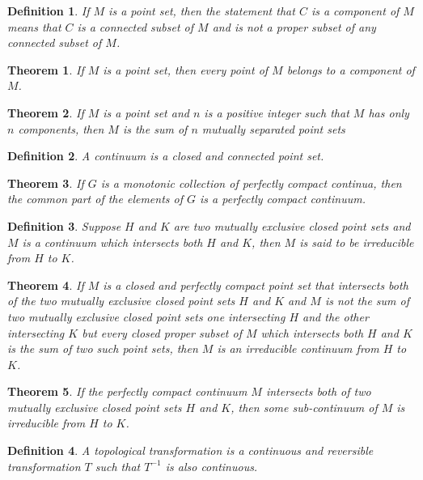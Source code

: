 \documentclass[10pt]{report}
\newtheorem{theorem}{Theorem}
\newtheorem{definition}{Definition}
\begin{document}
\begin{definition}
 If $M$ is a point set, then the statement that $C$ is a component of $M$ means that $C$ is a connected subset of $M$
and
is not a proper subset of any connected subset of $M$.
\end{definition}

\begin{theorem}
 If $M$ is a point set, then every point of $M$ belongs to a component of $M$.
\end{theorem}

\begin{theorem}
 If $M$ is a point set and $n$ is a positive integer such that $M$ has only $n$ components, then $M$ is the sum of $n$
mutually separated point sets
\end{theorem}

\begin{definition}
 A continuum is a closed and connected point set.
\end{definition}

\begin{theorem}
 If $G$ is a monotonic collection of perfectly compact continua, then the common part of the elements of $G$ is a
perfectly compact continuum.
\end{theorem}

\begin{definition}
 Suppose $H$ and $K$ are two mutually exclusive closed point sets and $M$ is a continuum which intersects both $H$ and
$K$, then $M$ is said to be irreducible from $H$ to $K$.
\end{definition}

\begin{theorem}
 If $M$ is a closed and perfectly compact point set that intersects both of the
two mutually exclusive closed point sets $H$ and $K$ and $M$ is not the sum of
two mutually exclusive closed point sets one intersecting $H$ and the other
intersecting $K$ but every closed proper subset of $M$ which intersects both
$H$ and $K$ is the sum of two such point sets, then $M$ is an irreducible
continuum from $H$ to $K$.
\end{theorem}

\begin{theorem}
 If the perfectly compact continuum $M$ intersects both of two mutually
exclusive closed point sets $H$ and $K$, then some sub-continuum of $M$ is
irreducible from $H$ to $K$.
\end{theorem}

\begin{definition}
 A topological transformation is a continuous and reversible transformation $T$
such that $T^{-1}$ is also continuous.
\end{definition}
\end{document}
